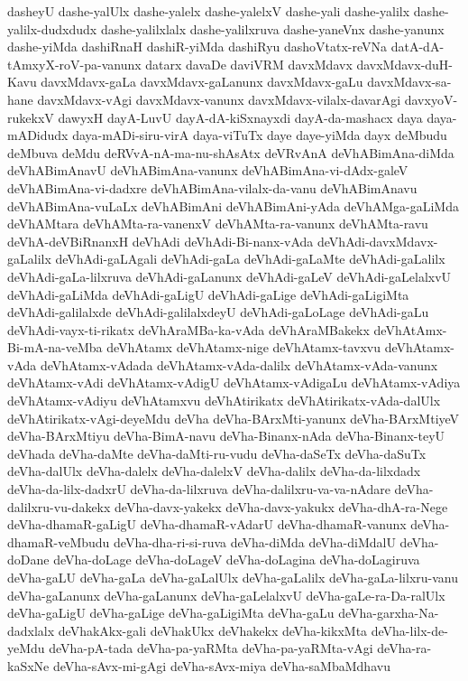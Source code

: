 {dasheyU
dashe-yalUlx
dashe-yalelx
dashe-yalelxV
dashe-yali
dashe-yalilx
dashe-yalilx-dudxdudx
dashe-yalilxlalx
dashe-yalilxruva
dashe-yaneVnx
dashe-yanunx
dashe-yiMda
dashiRnaH
dashiR-yiMda
dashiRyu
dashoVtatx-reVNa
datA-dA-tAmxyX-roV-pa-vanunx
datarx
davaDe
daviVRM
davxMdavx
davxMdavx-duH-Kavu
davxMdavx-gaLa
davxMdavx-gaLanunx
davxMdavx-gaLu
davxMdavx-sa-hane
davxMdavx-vAgi
davxMdavx-vanunx
davxMdavx-vilalx-davarAgi
davxyoV-rukekxV
dawyxH
dayA-LuvU
dayA-dA-kiSxnayxdi
dayA-da-mashacx
daya
daya-mADidudx
daya-mADi-siru-virA
daya-viTuTx
daye
daye-yiMda
dayx
deMbudu
deMbuva
deMdu
deRVvA-nA-ma-nu-shAsAtx
deVRvAnA
deVhABimAna-diMda
deVhABimAnavU
deVhABimAna-vanunx
deVhABimAna-vi-dAdx-galeV
deVhABimAna-vi-dadxre
deVhABimAna-vilalx-da-vanu
deVhABimAnavu
deVhABimAna-vuLaLx
deVhABimAni
deVhABimAni-yAda
deVhAMga-gaLiMda
deVhAMtara
deVhAMta-ra-vanenxV
deVhAMta-ra-vanunx
deVhAMta-ravu
deVhA-deVBiRnanxH
deVhAdi
deVhAdi-Bi-nanx-vAda
deVhAdi-davxMdavx-gaLalilx
deVhAdi-gaLAgali
deVhAdi-gaLa
deVhAdi-gaLaMte
deVhAdi-gaLalilx
deVhAdi-gaLa-lilxruva
deVhAdi-gaLanunx
deVhAdi-gaLeV
deVhAdi-gaLelalxvU
deVhAdi-gaLiMda
deVhAdi-gaLigU
deVhAdi-gaLige
deVhAdi-gaLigiMta
deVhAdi-galilalxde
deVhAdi-galilalxdeyU
deVhAdi-gaLoLage
deVhAdi-gaLu
deVhAdi-vayx-ti-rikatx
deVhAraMBa-ka-vAda
deVhAraMBakekx
deVhAtAmx-Bi-mA-na-veMba
deVhAtamx
deVhAtamx-nige
deVhAtamx-tavxvu
deVhAtamx-vAda
deVhAtamx-vAdada
deVhAtamx-vAda-dalilx
deVhAtamx-vAda-vanunx
deVhAtamx-vAdi
deVhAtamx-vAdigU
deVhAtamx-vAdigaLu
deVhAtamx-vAdiya
deVhAtamx-vAdiyu
deVhAtamxvu
deVhAtirikatx
deVhAtirikatx-vAda-dalUlx
deVhAtirikatx-vAgi-deyeMdu
deVha
deVha-BArxMti-yanunx
deVha-BArxMtiyeV
deVha-BArxMtiyu
deVha-BimA-navu
deVha-Binanx-nAda
deVha-Binanx-teyU
deVhada
deVha-daMte
deVha-daMti-ru-vudu
deVha-daSeTx
deVha-daSuTx
deVha-dalUlx
deVha-dalelx
deVha-dalelxV
deVha-dalilx
deVha-da-lilxdadx
deVha-da-lilx-dadxrU
deVha-da-lilxruva
deVha-dalilxru-va-va-nAdare
deVha-dalilxru-vu-dakekx
deVha-davx-yakekx
deVha-davx-yakukx
deVha-dhA-ra-Nege
deVha-dhamaR-gaLigU
deVha-dhamaR-vAdarU
deVha-dhamaR-vanunx
deVha-dhamaR-veMbudu
deVha-dha-ri-si-ruva
deVha-diMda
deVha-diMdalU
deVha-doDane
deVha-doLage
deVha-doLageV
deVha-doLagina
deVha-doLagiruva
deVha-gaLU
deVha-gaLa
deVha-gaLalUlx
deVha-gaLalilx
deVha-gaLa-lilxru-vanu
deVha-gaLanunx
deVha-gaLanunx
deVha-gaLelalxvU
deVha-gaLe-ra-Da-ralUlx
deVha-gaLigU
deVha-gaLige
deVha-gaLigiMta
deVha-gaLu
deVha-garxha-Na-dadxlalx
deVhakAkx-gali
deVhakUkx
deVhakekx
deVha-kikxMta
deVha-lilx-de-yeMdu
deVha-pA-tada
deVha-pa-yaRMta
deVha-pa-yaRMta-vAgi
deVha-ra-kaSxNe
deVha-sAvx-mi-gAgi
deVha-sAvx-miya
deVha-saMbaMdhavu
}
